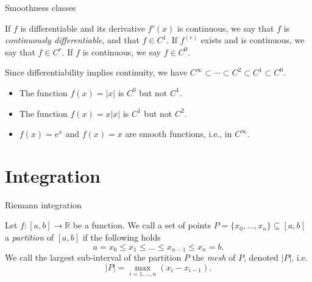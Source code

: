 \documentclass [aspectratio=169]{beamer}
\newcommand{\R}{{\mathbb{R}}}
\begin{document}
\begin{frame}{Smoothness classes}
\begin{definition}
If $f$ is differentiable and its derivative $f'(x)$ is continuous, we say that $f$ is \emph{continuously differentiable}, and that $f \in C^1$. If $f^{(r)}$ exists and is continuous, we say that $f \in C^r$. If $f$ is continuous, we say $f \in C^0$.
\end{definition}

\vspace{1em}

Since differentiability implies continuity, we have $C^\infty \subset \cdots \subset C^2 \subset C^1 \subset C^0$.

\end{frame}




\begin{frame}
\begin{example}
\begin{itemize}
\item The function $f(x) = |x|$ is $C^0$ but not $C^1$. 
\item The function $f(x) = x|x|$ is $C^1$ but not $C^2$.
\item $f(x) = e^x$ and $f(x) = x$ are smooth functions, i.e., in $C^\infty$.
\end{itemize}
\end{example}
\vspace{4cm}
\end{frame}

\section{Integration}


\begin{frame}{Riemann integration}
\begin{definition}
Let $f\colon [a,b] \to \R$ be a function. We call a set of points $P=\{x_0, \ldots, x_n\}\subseteq [a,b]$ a \emph{partition} of $[a,b]$ if the following holds
\begin{equation*}
    a = x_0 \leq x_1\leq \ldots \leq x_{n-1} \leq x_n = b.
\end{equation*}
We call the largest sub-interval of the partition $P$ the \emph{mesh} of $P$, denoted $|P|$, i.e.
$$ |P| = \max_{i=1,\ldots,n} ( x_i - x_{i-1} ).$$

\end{definition}

\end{frame}
\end{document}
